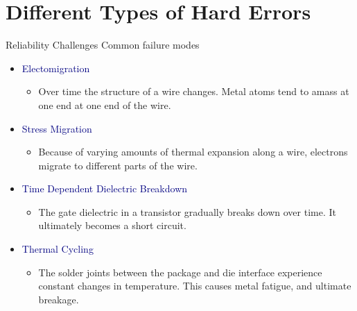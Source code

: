 \documentclass[xcolor=pdftex,dvipsnames,table,svgnames,x11names]{beamer}
\begin{document}
\section{Different Types of Hard Errors}
\begin{frame}{Reliability Challenges}
Common failure modes

\begin{itemize}

 \item \textcolor{Navy}{Electomigration} 
    \begin{itemize}
    \item Over time the structure of a wire changes. Metal atoms tend to amass at one end 
    at one end of the wire. 
    \end{itemize}
\pause
 \item \textcolor{Navy}{Stress Migration }
    \begin{itemize}
    \item  Because of varying amounts of thermal expansion along a wire, electrons migrate to
	  different parts of the wire.
    \end{itemize}
\pause
 \item \textcolor{Navy}{Time Dependent Dielectric Breakdown}
    \begin{itemize}
      \item The gate dielectric in a transistor gradually breaks down over time. It ultimately becomes
      a short circuit.
    \end{itemize}
\pause
 \item \textcolor{Navy}{Thermal Cycling}
    \begin{itemize}
    \item The solder joints between the package and die interface experience constant changes in 
    temperature. This causes metal fatigue, and ultimate breakage.
    \end{itemize}
\end{itemize}
\end{frame}
\end{document}
